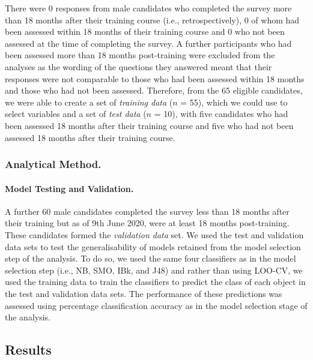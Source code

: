 \documentclass[
  12pt,
  a4paper,
]{book}
\begin{document}
There were 0 responses from male candidates who completed the survey more than 18 months after their training course (i.e., retrospectively), 0 of whom had been assessed within 18 months of their training course and 0 who not been assessed at the time of completing the survey. A further participants who had been assessed more than 18 months post-training were excluded from the analyses as the wording of the questions they answered meant that their responses were not comparable to those who had been assessed within 18 months and those who had not been assessed. Therefore, from the 65 eligible candidates, we were able to create a set of \emph{training data} (\(n\) = 55), which we could use to select variables and a set of \emph{test data} (\(n\) = 10), with five candidates who had been assessed 18 months after their training course and five who had not been assessed 18 months after their training course.

\hypertarget{male-gta-analytical-method}{%
\subsubsection{Analytical Method.}\label{male-gta-analytical-method}}

\hypertarget{model-testing-and-validation.}{%
\paragraph{Model Testing and Validation.}\label{model-testing-and-validation.}}

A further 60 male candidates completed the survey less than 18 months after their training but as of 9th June 2020, were at least 18 months post-training. These candidates formed the \emph{validation data} set. We used the test and validation data sets to test the generalisability of models retained from the model selection step of the analysis. To do so, we used the same four classifiers as in the model selection step (i.e., NB, SMO, IBk, and J48) and rather than using LOO-CV, we used the training data to train the classifiers to predict the class of each object in the test and validation data sets. The performance of these predictions was assessed using percentage classification accuracy as in the model selection stage of the analysis.

\hypertarget{male-gta-results}{%
\subsection{Results}\label{male-gta-results}}
\end{document}
